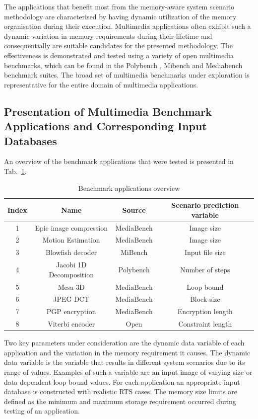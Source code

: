 \documentclass[smallextended]{svjour3}
\begin{document}
The applications that benefit most from the memory-aware system scenario methodology are characterised by having dynamic utilization of the memory organisation during their execution. 
Multimedia applications often exhibit such a dynamic variation in memory requirements during their lifetime and consequentially are suitable candidates for the presented methodology.
The effectiveness is demonstrated and tested using a variety of open multimedia benchmarks, which can be found in the Polybench \cite{Poly}, Mibench \cite{mibench} and Mediabench \cite{mediabench} benchmark suites.
The broad set of multimedia benchmarks under exploration is representative for the entire domain of multimedia applications. 

\subsection{Presentation of Multimedia Benchmark Applications and Corresponding Input Databases}

An overview of the benchmark applications that were tested is presented in Tab.~\ref{tab:app1}. 

\begin{table}
\caption{Benchmark applications overview}
\label{tab:app1}
{
\begin{tabular}{|c|c|c|c|}
\hline
\textbf{Index} & \textbf{Name} & \textbf{Source} & \textbf{Scenario prediction variable}\\ 
\hline 
1 & Epic image compression & MediaBench & Image size \\ 
\hline 
2 & Motion Estimation & MediaBench 	& Image size \\ 
\hline 
3 & Blowfish decoder & MiBench & Input file size \\ 
\hline 
4 & Jacobi 1D Decomposition & Polybench & Number of steps \\ 
\hline 
5 & Mesa 3D & MediaBench & Loop bound \\ 
\hline 
6 & JPEG DCT & MediaBench & Block size \\ 
\hline 
7 & PGP encryption & MediaBench & Encryption length \\ 
\hline 
8 & Viterbi encoder & Open & Constraint length \\ 
\hline 
\end{tabular}}
\end{table}

Two key parameters under consideration are the dynamic data variable of each application and the variation in the memory requirement it causes. 
The dynamic data variable is the variable that results in different system scenarios due to its range of values. 
Examples of such a variable are an input image of varying size or data dependent loop bound values. 
For each application an appropriate input database is constructed with realistic RTS cases. 
The memory size limits are defined as the minimum and maximum storage requirement occurred during testing of an application.
\end{document}
